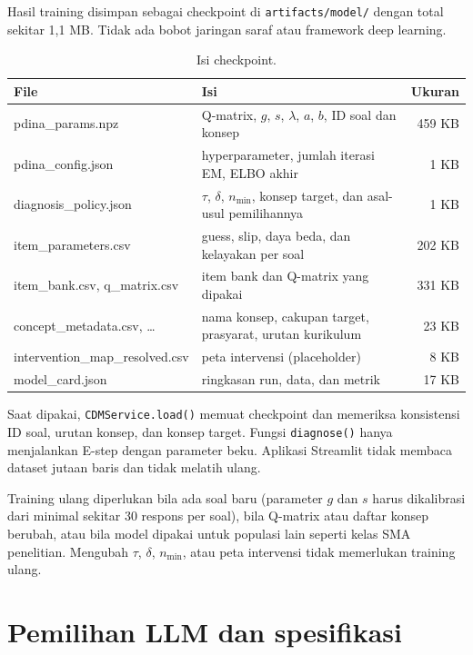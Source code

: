 \documentclass[11pt,a4paper]{article}
\begin{document}
Hasil training disimpan sebagai checkpoint di \texttt{artifacts/model/} dengan total sekitar 1,1 MB. Tidak ada bobot
jaringan saraf atau framework deep learning.

\begin{table}[h]
  \centering\small
  \begin{tabular}{@{}>{\ttfamily}l P{6.2cm} r@{}}
    \toprule
    \normalfont File & Isi & Ukuran \\
    \midrule
    pdina\_params.npz & Q-matrix, $g$, $s$, $\lambda$, $a$, $b$, ID soal dan konsep & 459 KB \\
    pdina\_config.json & hyperparameter, jumlah iterasi EM, ELBO akhir & 1 KB \\
    diagnosis\_policy.json & $\tau$, $\delta$, $n_{\min}$, konsep target, dan asal-usul pemilihannya & 1 KB \\
    item\_parameters.csv & guess, slip, daya beda, dan kelayakan per soal & 202 KB \\
    item\_bank.csv, q\_matrix.csv & item bank dan Q-matrix yang dipakai & 331 KB \\
    concept\_metadata.csv, \dots & nama konsep, cakupan target, prasyarat, urutan kurikulum & 23 KB \\
    intervention\_map\_resolved.csv & peta intervensi (placeholder) & 8 KB \\
    model\_card.json & ringkasan run, data, dan metrik & 17 KB \\
    \bottomrule
  \end{tabular}
  \caption{Isi checkpoint.}
\end{table}

Saat dipakai, \texttt{CDMService.load()} memuat checkpoint dan memeriksa konsistensi ID soal, urutan konsep, dan
konsep target. Fungsi \texttt{diagnose()} hanya menjalankan E-step dengan parameter beku. Aplikasi Streamlit tidak
membaca dataset jutaan baris dan tidak melatih ulang.

Training ulang diperlukan bila ada soal baru (parameter $g$ dan $s$ harus dikalibrasi dari minimal sekitar 30 respons
per soal), bila Q-matrix atau daftar konsep berubah, atau bila model dipakai untuk populasi lain seperti kelas SMA
penelitian. Mengubah $\tau$, $\delta$, $n_{\min}$, atau peta intervensi tidak memerlukan training ulang.

\section{Pemilihan LLM dan spesifikasi}
\end{document}
